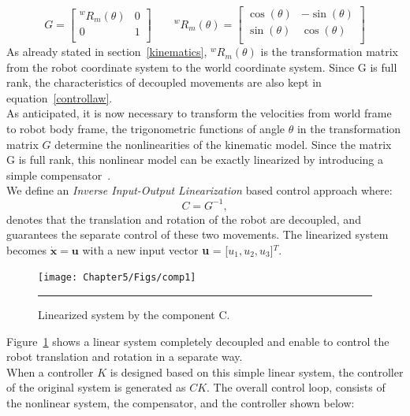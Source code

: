 \begin{equation}
G=\begin{bmatrix}
^wR_m(\theta) & 0\\
0 & 1\\
\end{bmatrix}\qquad
^wR_m(\theta)=\begin{bmatrix}
\cos(\theta) &-\sin(\theta)\\
\sin(\theta) & \cos(\theta)\\
\end{bmatrix}
\end{equation}
As already stated in section~\ref{kinematics}, $^wR_m(\theta)$ is the transformation matrix from the robot coordinate system to the world coordinate system. Since G is full rank, the characteristics of decoupled movements are also kept in equation~\ref{controllaw}.\\
As anticipated, it is now necessary to transform the velocities from world frame to robot body frame, the trigonometric functions of angle $\theta$ in the transformation matrix $G$ determine the nonlinearities of the kinematic model. Since the matrix G is full rank, this nonlinear model can be exactly linearized by introducing a simple compensator~\cite{li2009motion}.\\
We define an \textit{Inverse Input-Output Linearization} based control approach where:
\begin{equation}
C = G^{-1},
\end{equation} 
denotes that the translation and rotation of the robot are decoupled, and guarantees the separate control of these two movements.
The linearized system becomes $\mathbf{\dot{x}} = \mathbf{u}$ with a new input vector \textbf{u} = [$u_1,u_2,u_3$]$^T$.

\begin{figure}[H]
	\centering
	\texttt{[image: Chapter5/Figs/comp1]}
	\rule{35em}{0.5pt}
	\caption{Linearized system by the component C.} 
	\label{comp1}
\end{figure}

Figure~\ref{comp1} shows a linear system completely decoupled and enable to control the robot translation and rotation in a separate way. \\
When a controller $K$ is designed based on this simple linear system, the controller of the original system is generated as $CK$. The overall control loop, consists of the nonlinear system, the compensator, and the controller shown below:

